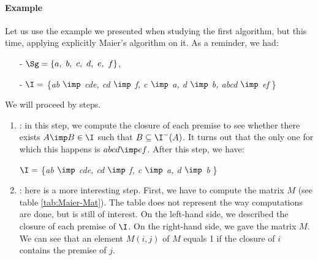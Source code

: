 \paragraph{Example} Let us use the example we presented when studying the first algorithm, but this time, applying explicitly Maier's algorithm on it. As a reminder, we had:
\begin{itemize}
	\item[-] $\Sg = \{a, \ b, \ c, \ d, \ e, \ f \}$,
	\item[-] $\I =$ \{\textit{ab $\imp$ cde, cd $\imp$ f, c $\imp$ a, d $\imp$ b, abcd $\imp$ ef} \} 
\end{itemize}
\noindent We will proceed by steps.
\begin{enumerate}
	\item {}: in this step, we compute the closure
	of each premise to see whether there exists $A \imp B \in \I$ such that 
	$B \subseteq \I^{-}(A)$. It turns out that the only one for which
	this happens is $abcd \imp ef$. After this step, we have:
	
	\begin{center}
		$\I =$ \{\textit{ab $\imp$ cde, cd $\imp$ f, c $\imp$ a, d $\imp$ b} \} 
	\end{center}
	
	\item {}: here is a more interesting step.
	First, we have to compute the matrix $M$ (see table \ref{tab:Maier-Mat}).
	The table does not represent the way computations are done, but is still of
	interest. On the left-hand side, we described the closure of each premise
	of $\I$. On the right-hand side, we gave the matrix $M$. We can see that
	an element $M(i, j)$ of $M$ equals 1 if the closure of $i$ contains the
	premise of $j$.
	
	\begin{table}[ht]
		\centering
		\quad
\end{table}
\end{enumerate}
